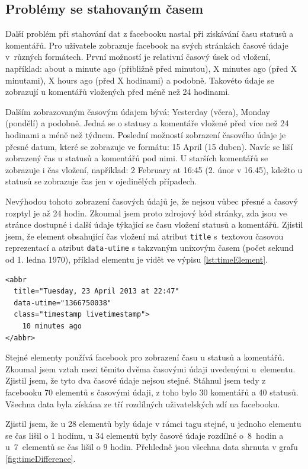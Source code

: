 \documentclass[thesis=M,czech]{FITthesis}[2013/05/10]
\begin{document}
\subsection{Problémy se stahovaným časem}

Další problém při stahování dat z facebooku nastal při získávání času statusů a komentářů. Pro uživatele zobrazuje facebook na svých stránkách časové údaje v~různých formátech. První možností je relativní časový úsek od vložení, například: about a minute ago (přibližně před minutou), X minutes ago (před X minutami), X hours ago (před X hodinami) a podobně. Takovéto údaje se zobrazují u komentářů vložených před méně než 24 hodinami. 

Dalším zobrazovaným časovým údajem bývá: Yesterday (včera), Monday (pondělí) a podobně. Jedná se o statusy a komentáře vložené před více než 24 hodinami a méně než týdnem. Poslední možností zobrazení časového údaje je přesné datum, které se zobrazuje ve formátu: 15 April (15 duben). Navíc se liší zobrazený čas u statusů a komentářů pod nimi. U starších komentářů se zobrazuje i čas vložení, například: 2 February at 16:45 (2. únor v 16.45), kdežto u statusů se zobrazuje čas jen v ojedinělých případech.

Nevýhodou tohoto zobrazení časových údajů je, že nejsou vůbec přesné a časový rozptyl je až 24 hodin. Zkoumal jsem proto zdrojový kód stránky, zda jsou ve stránce dostupné i další údaje týkající se času vložení statusů a komentářů. Zjistil jsem, že element obsahující čas vložení má atribut \verb|title| s~textovou časovou reprezentací a atribut \verb|data-utime| s takzvaným unixovým časem (počet sekund od 1. ledna 1970), příklad elementu je vidět ve výpisu \ref{lst:timeElement}. 

\begin{lstlisting}[caption={Příklad elementu obsahující čas},label=lst:timeElement,belowcaptionskip=0.4cm]
<abbr 
  title="Tuesday, 23 April 2013 at 22:47"
  data-utime="1366750038" 
  class="timestamp livetimestamp">
    10 minutes ago
</abbr>
\end{lstlisting}

Stejné elementy používá facebook pro zobrazení času u statusů a komentářů. Zkoumal jsem vztah mezi těmito dvěma časovými údaji uvedenými u~elementu. Zjistil jsem, že tyto dva časové údaje nejsou stejné. Stáhnul jsem tedy z facebooku 70 elementů s časovými údaji, z toho bylo 30 komentářů a 40 statusů. Všechna data byla získána ze tří rozdílných uživatelských zdí na facebooku. 

Zjistil jsem, že u 28 elementů byly údaje v rámci tagu stejné, u jednoho elementu se čas lišil o 1 hodinu, u 34 elementů byly časové údaje rozdílné o~8~hodin a u~7~elementů se čas lišil o 9 hodin. Přehledně jsou všechna data shrnuta v grafu \ref{fig:timeDifference}.
\end{document}
